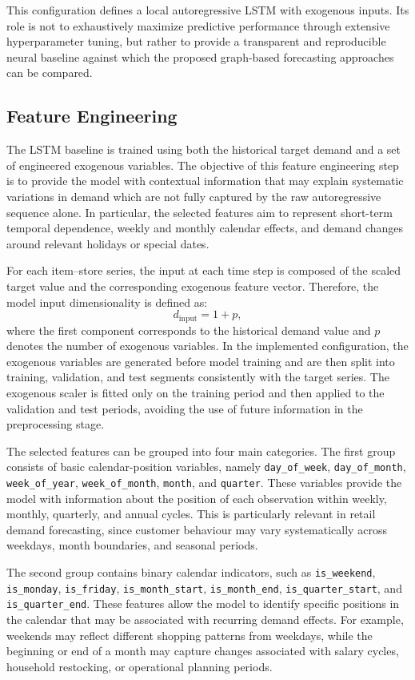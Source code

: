 This configuration defines a local autoregressive LSTM with exogenous inputs. Its role is not to exhaustively maximize predictive performance through extensive hyperparameter tuning, but rather to provide a transparent and reproducible neural baseline against which the proposed graph-based forecasting approaches can be compared.

\subsection{Feature Engineering}
\label{subsec:lstm_feature_engineering}

The LSTM baseline is trained using both the historical target demand and a set of engineered exogenous variables. The objective of this feature engineering step is to provide the model with contextual information that may explain systematic variations in demand which are not fully captured by the raw autoregressive sequence alone. In particular, the selected features aim to represent short-term temporal dependence, weekly and monthly calendar effects, and demand changes around relevant holidays or special dates.

For each item--store series, the input at each time step is composed of the scaled target value and the corresponding exogenous feature vector. Therefore, the model input dimensionality is defined as:
\[
d_{\text{input}} = 1 + p,
\]
where the first component corresponds to the historical demand value and \(p\) denotes the number of exogenous variables. In the implemented configuration, the exogenous variables are generated before model training and are then split into training, validation, and test segments consistently with the target series. The exogenous scaler is fitted only on the training period and then applied to the validation and test periods, avoiding the use of future information in the preprocessing stage.

The selected features can be grouped into four main categories. The first group consists of basic calendar-position variables, namely \texttt{day\_of\_week}, \texttt{day\_of\_month}, \texttt{week\_of\_year}, \texttt{week\_of\_month}, \texttt{month}, and \texttt{quarter}. These variables provide the model with information about the position of each observation within weekly, monthly, quarterly, and annual cycles. This is particularly relevant in retail demand forecasting, since customer behaviour may vary systematically across weekdays, month boundaries, and seasonal periods.

The second group contains binary calendar indicators, such as \texttt{is\_weekend}, \texttt{is\_monday}, \texttt{is\_friday}, \texttt{is\_month\_start}, \texttt{is\_month\_end}, \texttt{is\_quarter\_start}, and \texttt{is\_quarter\_end}. These features allow the model to identify specific positions in the calendar that may be associated with recurring demand effects. For example, weekends may reflect different shopping patterns from weekdays, while the beginning or end of a month may capture changes associated with salary cycles, household restocking, or operational planning periods.

